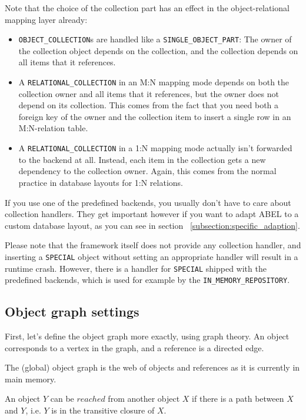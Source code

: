 Note that the choice of the collection part has an effect in the object-re\-la\-tio\-nal mapping layer already:
\begin{itemize}
 \item \lstinline!OBJECT_COLLECTION!s are handled like a \lstinline!SINGLE_OBJECT_PART!: The owner of the collection object depends on the collection, and the collection depends on all items that it references.
 \item A \lstinline!RELATIONAL_COLLECTION! in an M:N mapping mode depends on both the collection owner and all items that it references, but the owner does not depend on its collection.
 This comes from the fact that you need both a foreign key of the owner and the collection item to insert a single row in an M:N-relation table.
 \item A \lstinline!RELATIONAL_COLLECTION! in a 1:N mapping mode actually isn't forwarded to the backend at all. 
 Instead, each item in the collection gets a new dependency to the collection owner.
 Again, this comes from the normal practice in database layouts for 1:N relations.
\end{itemize}


If you use one of the predefined backends, you usually don't have to care about collection handlers.
They get important however if you want to adapt ABEL to a custom database layout, as you can see in section ~\ref{subsection:specific_adaption}.

Please note that the framework itself does not provide any collection handler, and inserting a \lstinline!SPECIAL! object without setting an appropriate handler will result in a runtime crash.
However, there is a handler for \lstinline!SPECIAL! shipped with the predefined backends, which is used for example by the \lstinline!IN_MEMORY_REPOSITORY!.

\subsection{Object graph settings}
\label{subsection:obect_graph_settings}

First, let's define the object graph more exactly, using graph theory.
An object corresponds to a vertex in the graph, and a reference is a directed edge.

The (global) object graph is the web of objects and references as it is currently in main memory.

An object $Y$ can be $reached$ from another object $X$ if there is a path between $X$ and $Y$, i.e. $Y$ is in the transitive closure of $X$.

